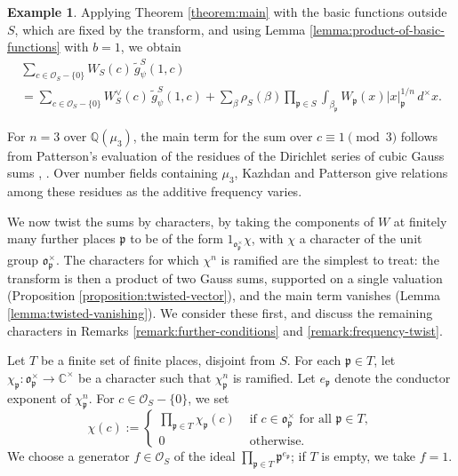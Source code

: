 \documentclass[reqno]{amsart}
\theoremstyle{plain}
\theoremstyle{definition}
\newtheorem{example}[theorem]{Example}
\theoremstyle{itplain}
\numberwithin{equation}{section}
\numberwithin{theorem}{section}
\begin{document}
\begin{example}\label{example:simplest}
  Applying Theorem \ref{theorem:main} with the basic functions outside $S$, which are fixed by the transform, and using Lemma \ref{lemma:product-of-basic-functions} with $b = 1$, we obtain
  \begin{multline*}
    \sum_{c \in \mathcal{O}_S - \{0\}}
    W_S(c) \, \tilde{g}_\psi^S(1, c)
    \\
    =
    \sum_{c \in \mathcal{O}_S - \{0\}}
    W_S^\vee (c) \, \tilde{g}_\psi^S(1, c)
    +
    \sum_{\beta} \rho_S(\beta)
    \prod_{\mathfrak{p} \in S}
    \int_{\beta_{\mathfrak{p}}} W_{\mathfrak{p}}(x)
    \lvert x \rvert_{\mathfrak{p}}^{1/n} \, d^\times x.
  \end{multline*}
\end{example}
For $n = 3$ over $\mathbb{Q}(\mu_3)$, the main term for the sum over $c \equiv 1 \pmod{3}$ follows from Patterson's evaluation of the residues of the Dirichlet series of cubic Gauss sums \cite[Theorem~9.1]{Patterson1977CubicTheta}, \cite{Patterson1977CubicThetaII}.  Over number fields containing $\mu_3$, Kazhdan and Patterson \cite[\S II.3, pp.~134--135]{PMIHES_1984__59__35_0} give relations among these residues as the additive frequency varies.

We now twist the sums by characters, by taking the components of $W$ at finitely many further places $\mathfrak{p}$ to be of the form $1_{\mathfrak{o}_{\mathfrak{p}}^\times} \chi$, with $\chi$ a character of the unit group $\mathfrak{o}_{\mathfrak{p}}^\times$.  The characters for which $\chi^n$ is ramified are the simplest to treat: the transform is then a product of two Gauss sums, supported on a single valuation (Proposition \ref{proposition:twisted-vector}), and the main term vanishes (Lemma \ref{lemma:twisted-vanishing}).  We consider these first, and discuss the remaining characters in Remarks \ref{remark:further-conditions} and \ref{remark:frequency-twist}.

Let $T$ be a finite set of finite places, disjoint from $S$.  For each $\mathfrak{p} \in T$, let $\chi_{\mathfrak{p}}: \mathfrak{o}_{\mathfrak{p}}^\times \rightarrow \mathbb{C}^\times$ be a character such that $\chi_{\mathfrak{p}}^n$ is ramified.  Let $e_{\mathfrak{p}}$ denote the conductor exponent of $\chi_{\mathfrak{p}}^n$.  For $c \in \mathcal{O}_S - \{0\}$, we set
\begin{equation*}
  \chi(c) :=
  \begin{cases}
    \prod_{\mathfrak{p} \in T} \chi_{\mathfrak{p}}(c) & \text{ if } c \in \mathfrak{o}_{\mathfrak{p}}^\times \text{ for all } \mathfrak{p} \in T, \\
    0 & \text{ otherwise.}
  \end{cases}
\end{equation*}
We choose a generator $f \in \mathcal{O}_S$ of the ideal $\prod_{\mathfrak{p} \in T} \mathfrak{p}^{e_{\mathfrak{p}}}$; if $T$ is empty, we take $f = 1$.
\end{document}
